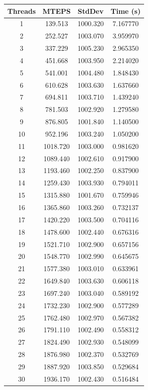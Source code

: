 \documentclass[10pt,twocolumn,letterpaper]{article}
\begin{document}
\begin{table}[h]
\renewcommand\arraystretch{0.8}
\centering
\begin{tabular}{@{}c|ccc@{}}
\toprule
Threads          & MTEPS  & StdDev     & Time (s)      \\ \midrule
1 & 139.513 & 1000.320 & 7.167770 \\
2 & 252.527 & 1003.070 & 3.959970 \\
3 & 337.229 & 1005.230 & 2.965350 \\
4 & 451.668 & 1003.950 & 2.214020 \\
5 & 541.001 & 1004.480 & 1.848430 \\
6 & 610.628 & 1003.630 & 1.637660 \\
7 & 694.811 & 1003.710 & 1.439240 \\
8 & 781.503 & 1002.920 & 1.279580 \\
9 & 876.805 & 1001.840 & 1.140500 \\
10 & 952.196 & 1003.240 & 1.050200 \\
11 & 1018.720 & 1003.000 & 0.981620 \\
12 & 1089.440 & 1002.610 & 0.917900 \\
13 & 1193.460 & 1002.250 & 0.837900 \\
14 & 1259.430 & 1003.930 & 0.794011 \\
15 & 1315.880 & 1001.670 & 0.759946 \\
16 & 1365.860 & 1003.260 & 0.732137 \\
17 & 1420.220 & 1003.500 & 0.704116 \\
18 & 1478.600 & 1002.440 & 0.676316 \\
19 & 1521.710 & 1002.900 & 0.657156 \\
20 & 1548.770 & 1002.990 & 0.645675 \\
21 & 1577.380 & 1003.010 & 0.633961 \\
22 & 1649.840 & 1003.630 & 0.606118 \\
23 & 1697.240 & 1003.040 & 0.589192 \\
24 & 1732.230 & 1002.900 & 0.577289 \\
25 & 1762.480 & 1002.970 & 0.567382 \\
26 & 1791.110 & 1002.490 & 0.558312 \\
27 & 1824.490 & 1002.930 & 0.548099 \\
28 & 1876.980 & 1002.370 & 0.532769 \\
29 & 1887.920 & 1003.850 & 0.529684 \\
30 & 1936.170 & 1002.430 & 0.516484 \\

\end{tabular}
\end{table}
\end{document}
